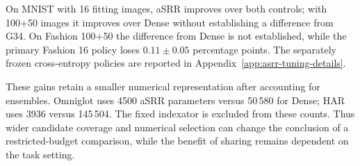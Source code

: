 On MNIST with 16 fitting images, aSRR improves over both controls;
with 100+50 images it improves over Dense without establishing a
difference from G34. On Fashion 100+50 the difference from Dense is
not established, while the primary Fashion 16 policy loses
$0.11\pm0.05$ percentage points. The separately frozen cross-entropy
policies are reported in Appendix~\ref{app:asrr-tuning-details}.

These gains retain a smaller numerical representation after accounting
for ensembles. Omniglot uses 4500 aSRR parameters versus 50\,580 for
Dense; HAR uses 3936 versus 145\,504. The fixed indexator is excluded
from these counts. Thus wider candidate coverage and numerical selection
can change the conclusion of a restricted-budget comparison, while the
benefit of sharing remains dependent on the task setting.
